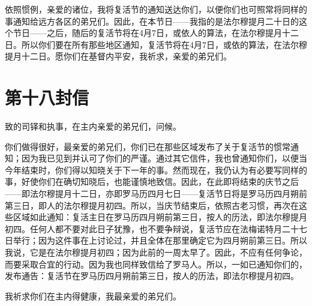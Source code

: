 依照惯例，亲爱的诸位，我将复活节的通知送达你们，以便你们也可照常将同样的事通知给远方各区的弟兄们。因此，在本节日——我指的是法尔穆提月二十日的这个节日——之后，随后的复活节将在4月7日，或依人的算法，在法尔穆提月十二日。所以你们要在所有那些地区通知，复活节将在4月7日，或依的算法，在法尔穆提月十二日。愿你们在基督内平安，我祈求，亲爱的弟兄们。\par



\section{第十八封信}

\par

致的司铎和执事，在主内亲爱的弟兄们，问候。\par

你们做得很好，最亲爱的弟兄们，你们已在那些区域发布了关于复活节的惯常通知；因为我已见到并认可了你们的严谨。通过其它信件，我也曾通知你们，以便当今年结束时，你们得以知晓关于下一年的事。然而现在，我仍认为有必要写同样的事，好使你们在确切知晓后，也能谨慎地致信。因此，在此即将结束的庆节之后——即法尔穆提月十二日，亦即罗马历四月七日——复活节日将是罗马历四月朔前第三日，即人的法尔穆提月初四。所以，当庆节结束后，依照古老习惯，再次在这些区域如此通知：复活主日在罗马历四月朔前第三日，按人的历法，即法尔穆提月初四。任何人都不要对此日子犹豫，也不要争辩说，复活节应在法梅诺特月二十七日举行；因为这件事在上讨论过，并且全体在那里确定它为四月朔前第三日。所以我说，它是在法尔穆提月初四；因为此前的一周太早了。因此，不应有任何争论，而要采取合宜的行动。因为我也同样致信给了罗马人。所以，一如已通知你们的，发布通告：复活节在罗马历四月朔前第三日，按人的历法，即法尔穆提月初四。\par

我祈求你们在主内得健康，我最亲爱的弟兄们。\par

